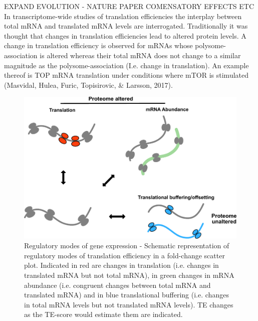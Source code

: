 \documentclass[12pt,openany]{book}
\begin{document}
EXPAND EVOLUTION - NATURE PAPER COMENSATORY EFFECTS ETC In
transcriptome-wide studies of translation efficiencies the interplay
between total mRNA and translated mRNA levels are interrogated.
Traditionally it was thought that changes in translation efficiencies
lead to altered protein levels. A change in translation efficiency is
observed for mRNAs whose polysome-association is altered whereas their
total mRNA does not change to a similar magnitude as the
polysome-association (I.e. change in translation). An example thereof is
TOP mRNA translation under conditions where mTOR is stimulated
(Masvidal, Hulea, Furic, Topisirovic, \& Larsson, 2017).

\begin{figure}
  \includegraphics{./figures/geneModes_MRNA.pdf}
  \caption{Regulatory modes of gene expression - Schematic representation of regulatory modes of translation efficiency in a fold-change scatter plot. Indicated in red are changes in translation (i.e. changes in translated mRNA but not total mRNA), in green changes in mRNA abundance (i.e. congruent changes between total mRNA and translated mRNA) and in blue translational buffering (i.e. changes in total mRNA levels but not translated mRNA levels). TE changes as the TE-score would estimate them are indicated.\label{fig:mRNA}}
\end{figure}
\end{document}
